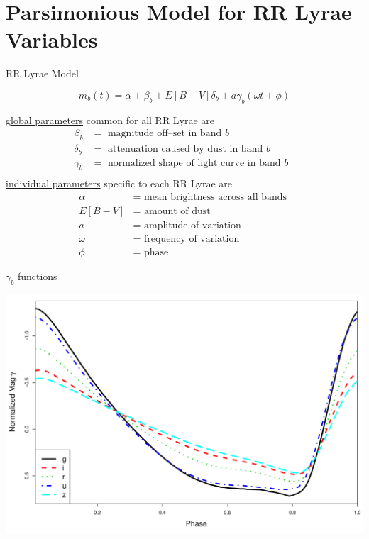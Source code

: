 \documentclass[12pt]{beamer}
\begin{document}


\section{Parsimonious Model for RR Lyrae Variables}

\begin{frame}{RR Lyrae Model}

\begin{equation*}
m_b(t) = \alpha + \beta_b + E[B-V]\delta_b + a\gamma_b(\omega t + \phi)
\end{equation*}

\underline{global parameters} common for all RR Lyrae are
\begin{align*}
\beta_b &=  \text{ magnitude off--set in band $b$ }\\
\delta_b &= \text{ attenuation caused by dust in band $b$ }\\
\gamma_b &= \text{ normalized shape of light curve in band $b$ }\\
\end{align*}
\underline{individual parameters} specific to each RR Lyrae are
\begin{align*}
\alpha &= \text{ mean brightness across all bands }\\
E[B-V] &= \text{ amount of dust }\\
a &= \text{ amplitude of variation }\\
\omega &= \text{ frequency of variation }\\
\phi &= \text{ phase }
\end{align*}

\end{frame}



\begin{frame}{$\gamma_b$ functions}

\begin{center}
\includegraphics[scale=.3]{figs/templates.pdf}
\end{center}

\end{frame}
\end{document}
